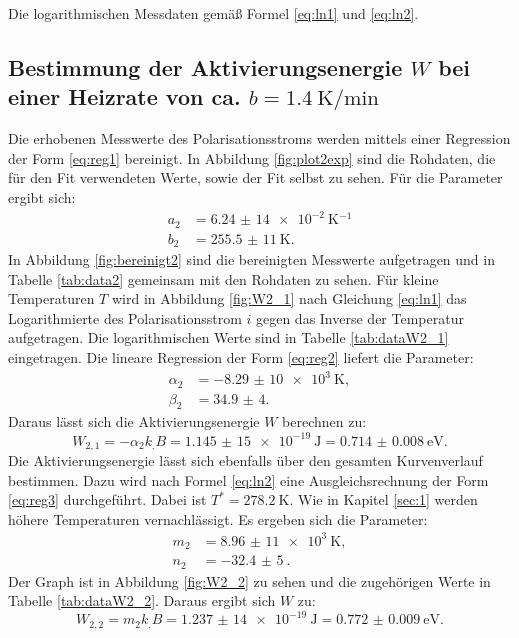 \begin{table}
\caption{Die logarithmischen Messdaten gemäß Formel \eqref{eq:ln1} und \eqref{eq:ln2}.}
\begin{minipage}[t]{0.5\textwidth}
	\centering
	
	\label{tab:dataW1_1}
\end{minipage}
\begin{minipage}[t]{0.5\textwidth}
	\centering
	
	\label{tab:dataW1_2}
\end{minipage}
\end{table}


\subsection{Bestimmung der Aktivierungsenergie $W$ bei einer Heizrate von ca. $b=\SI{1,4}{\kelvin\per\minute}$}

Die erhobenen Messwerte des Polarisationsstroms werden mittels einer Regression der Form \eqref{eq:reg1} bereinigt. In Abbildung \ref{fig:plot2exp} sind die Rohdaten, die für den Fit verwendeten Werte, sowie der Fit selbst zu sehen.
Für die Parameter ergibt sich:
\begin{align*}
a_2&=\SI{6,24(14)e-2}{\kelvin^{-1}}\\
b_2&=\SI{255,5(11)}{\kelvin}\text{.}
\end{align*}
In Abbildung \ref{fig:bereinigt2} sind die bereinigten Messwerte aufgetragen und in Tabelle \ref{tab:data2} gemeinsam mit den Rohdaten zu sehen.
Für kleine Temperaturen $T$ wird in Abbildung \ref{fig:W2_1} nach Gleichung \eqref{eq:ln1} das Logarithmierte des Polarisationsstrom $i$ gegen das Inverse der Temperatur aufgetragen. Die logarithmischen Werte sind in Tabelle \ref{tab:dataW2_1} eingetragen.
Die lineare Regression der Form \eqref{eq:reg2} liefert die Parameter:
\begin{align*}
\alpha_2&=\SI{-8,29(10)e3}{\kelvin},\\
\beta_2 &= \num{34,9(4)}\text{.}
\end{align*}
Daraus lässt sich die Aktivierungsenergie $W$ berechnen zu:
\[
W_{2,1} = -\alpha_2 k_.B =\SI{1,145(15)e-19}{\joule}=\SI{0.714(8)}{\electronvolt}\text{.}
\]
Die Aktivierungsenergie lässt sich ebenfalls über den gesamten Kurvenverlauf bestimmen. Dazu wird nach Formel \eqref{eq:ln2} eine Ausgleichsrechnung der Form \eqref{eq:reg3} durchgeführt. Dabei ist $T^*=\SI{278,2}{\kelvin}$. Wie in Kapitel \ref{sec:1} werden höhere Temperaturen vernachlässigt. Es ergeben sich die Parameter:
\begin{align*}
m_2&=\SI{8,96(11)e3}{\kelvin},\\
n_2&=\SI{-32,4(5)}{}\text{.}
\end{align*}
Der Graph ist in Abbildung \ref{fig:W2_2} zu sehen und die zugehörigen Werte in Tabelle \ref{tab:dataW2_2}.
Daraus ergibt sich $W$ zu:
\[
W_{2,2} = m_2 k_.B =\SI{1,237(14)e-19}{\joule}=\SI{0.772(9)}{\electronvolt}\text{.}
\]

